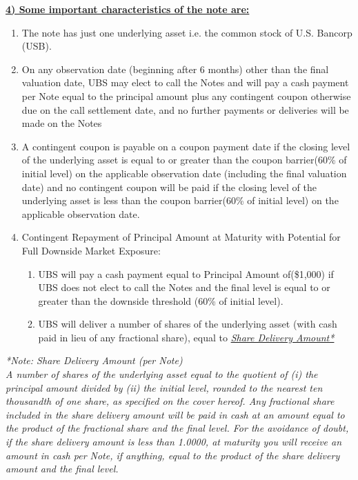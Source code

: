 \documentclass[12pt,a4paper]{article}
\begin{document}
\vspace{0.5cm}

\underline{\textbf{4) Some important characteristics of the note are:}}
\begin{enumerate}
\item The note has just one underlying asset i.e. the common stock of U.S. Bancorp (USB). 
\item On any observation date (beginning after 6 months) other than the final valuation date, UBS may elect to call the Notes and will pay a cash payment per Note equal to the principal amount plus any contingent coupon otherwise due on the call settlement date, and no further payments or deliveries will be made on the Notes
\item A contingent coupon is payable on a coupon payment date if the closing level of the underlying asset is equal to or greater than the coupon barrier(60\% of initial level) on the applicable observation date (including the final valuation date) and no contingent coupon will be paid if the closing level of the underlying asset is less than the coupon barrier(60\% of initial level) on the applicable observation date.
\item Contingent Repayment of Principal Amount at Maturity with Potential for Full Downside Market Exposure:
	\begin{enumerate}
	\item UBS will pay a cash payment equal to Principal Amount of(\$1,000) if UBS does not elect to call the Notes and the final level is equal to or greater than the downside 			threshold (60\% of initial level).
	\item UBS will deliver a number of shares of the underlying asset (with cash paid in lieu of any fractional share), equal to \underline{\textit{Share Delivery Amount*}}
	\end{enumerate}
\end{enumerate}
{\small \textit{*Note: Share Delivery Amount (per Note)\\
A number of shares of the underlying asset equal to the quotient of (i) the principal amount divided by (ii) the initial level, rounded to the nearest ten thousandth of one share, as specified on the cover hereof. Any fractional share included in the share delivery amount will be paid in cash at an amount equal to the product of the fractional share and the final level. For the avoidance of doubt, if the share delivery amount is less than 1.0000, at maturity you will receive an amount in cash per Note, if anything, equal to the product of the share delivery amount and the final level.}}
\end{document}

